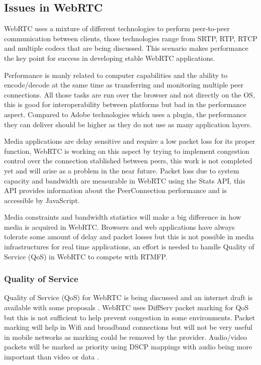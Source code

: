 \subsection{Issues in WebRTC}

WebRTC uses a mixture of different technologies to perform peer-to-peer communication between clients, those technologies range from SRTP, RTP, RTCP and multiple codecs that are being discussed. This scenario makes performance the key point for success in developing stable WebRTC applications. 

Performance is manly related to computer capabilities and the ability to encode/decode at the same time as transferring and monitoring multiple peer connections. All those tasks are run over the browser and not directly on the OS, this is good for interoperability between platforms but bad in the performance aspect. Compared to Adobe technologies which uses a plugin, the performance they can deliver should be higher as they do not use as many application layers.

Media applications are delay sensitive and require a low packet loss for its proper function, WebRTC is working on this aspect by trying to implement congestion control over the connection stablished between peers, this work is not completed yet and will arise as a problem in the near future. Packet loss due to system capacity and bandwidth are measurable in WebRTC using the Stats API, this API provides information about the PeerConnection performance and is accessible by JavaScript.

Media constraints and bandwidth statistics will make a big difference in how media is acquired in WebRTC. Browsers and web applications have always tolerate some amount of delay and packet losses but this is not possible in media infrastructures for real time applications, an effort is needed to handle Quality of Service (QoS) in WebRTC to compete with RTMFP.

\subsubsection{Quality of Service}

Quality of Service (QoS) for WebRTC is being discussed and an internet draft is available with some proposals \cite{qosWebRTCIETF}. WebRTC uses DiffServ packet marking for QoS but this is not sufficient to help prevent congestion in some environments. Packet marking will help in Wifi and broadband connections but will not be very useful in mobile networks as marking could be removed by the provider. Audio/video packets will be marked as priority using DSCP mappings with audio being more important than video or data \cite{qosWebRTCIETF}. 

